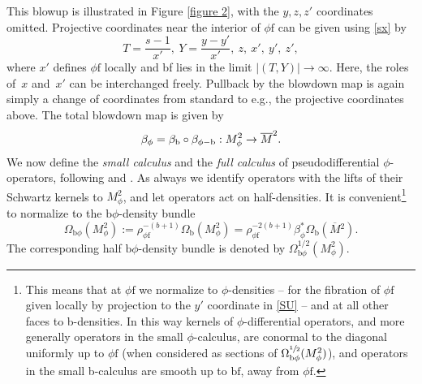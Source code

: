 \documentclass[11pt]{article}
\newcommand{\eg}{e.g.,\xspace}
\numberwithin{equation}{section}
\newcommand{\phib}{{\phi\textup{-}\bb}}
\newcommand{\bphi}{{\bb\phi}}
\theoremstyle{plain}
\theoremstyle{definition}
\newcommand{\phif}{{\phi\mathrm{f}}}
\newcommand{\bb}{{\mathrm{b}}}
\newcommand{\bbf}{{\mathrm{bf}}}
\newcommand{\Mbar}{{\overline{M}}}\let\M\Mbar
\begin{document}
This blowup is illustrated in Figure \ref{figure 2}, with the $y,z,z'$ coordinates omitted.
Projective coordinates near the interior of $\phif$ can be given using \eqref{sx} by
\begin{equation}\label{SU}
T = \frac{s-1}{x'}, \ Y = \frac{y-y'}{x'},\ z, \ x', \ y', \ z',
\end{equation}
where $x'$ defines $\phif$ locally
and bf lies in the limit $|(T,Y)| \to \infty$. Here, the roles of~$x$ and~$x'$ can be interchanged
freely. Pullback by the blowdown map is again simply
a change of coordinates from standard to \eg the projective coordinates above. The total blowdown map is given by
\begin{align*}
\beta_{\phi} = \beta_\bb\circ \beta_{\phib}
: M^{2}_{\phi} \to \M^{2}.
\end{align*}
We now define the \emph{small calculus} and the \emph{full calculus} of pseudodifferential $\phi$\nobreakdash-ope\-ra\-tors, following
\cite{mazzeo1998pseudodifferential} and \cite{grieser2009pseudodifferential}.
As always we identify operators with the lifts of their Schwartz kernels to $M^2_\phi$, and let operators act on half-densities.
It is convenient\footnote{This means that at $\phif$ we normalize to $\phi$-densities -- for the fibration of $\phif$ given locally by projection to the $y'$ coordinate in \eqref{SU} -- and at all other faces to b-densities. In this way kernels of $\phi$-differential operators, and more generally operators in the small $\phi$-calculus, are conormal to the diagonal
uniformly up to $\phif$ (when considered as sections of $\Omega_{\bphi}^{\sfrac12}(M^2_\phi)$), and operators in the small b-calculus are smooth up to $\bbf$, away from $\phif$.}
to normalize to the $\bphi$-density bundle
\begin{equation}
\label{eqn:densities M2phi}
\Omega_{\bphi}(M^2_\phi) := \rho_\phif^{-(b+1)}\Omega_\bb(M^2_\phi) =
\rho_\phif^{-2(b+1)}\beta_\phi^* \Omega_\bb(\Mbar{}^2).
\end{equation}
The corresponding half $\bphi$-density bundle is denoted by $\Omega^{1/2}_{\bphi}(M^2_\phi)$.
\end{document}
